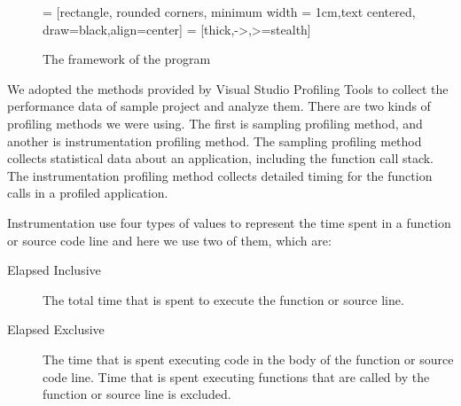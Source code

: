 \begin{figure}
	\centering
	 = [rectangle, rounded corners, minimum width = 1cm,text centered, draw=black,align=center]
	 = [thick,->,>=stealth]
	\caption{The framework of the program}
	\label{ch3 fig:workflow calltree}
\end{figure}

We adopted the methods provided by Visual Studio Profiling Tools to collect the performance data of sample project and analyze them. There are two kinds of profiling methods we were using. The first is sampling
profiling method, and another is instrumentation profiling method. The sampling profiling method collects statistical data about an application, including the function call stack. The instrumentation profiling method collects detailed timing for the function calls in a profiled application. 


Instrumentation use four types of values to represent the time spent in a function or source code line and here we use two of them, which are:
\begin{description}
	\item[Elapsed Inclusive]\quad The total time that is spent to execute the function or source line.
	\item[Elapsed Exclusive]\quad The time that is spent executing code in the body of the function or source code line. Time that is spent executing functions that are called by the function or source line is excluded.%
\end{description}

